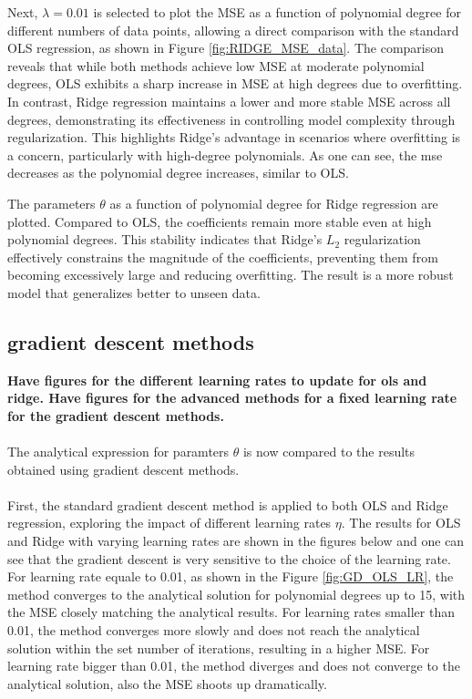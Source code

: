 \documentclass[%
 reprint,            %
 amsmath,amssymb,
 aps,
]{revtex4-2}
\begin{document}


Next, $\lambda = 0.01$ is selected to plot the MSE as a function of polynomial degree for different numbers of data points, allowing a direct comparison with the standard OLS regression, as shown in Figure \ref{fig:RIDGE_MSE_data}. 
The comparison reveals that while both methods achieve low MSE at moderate polynomial degrees, OLS exhibits a sharp increase in MSE at high degrees due to overfitting. In contrast, Ridge regression maintains a lower and more stable MSE across all degrees, demonstrating its effectiveness in controlling model complexity through regularization. This highlights Ridge's advantage in scenarios where overfitting is a concern, particularly with high-degree polynomials.
As one can see, the mse decreases as the polynomial degree increases, similar to OLS.


The parameters $\theta$ as a function of polynomial degree for Ridge regression are plotted. Compared to OLS, the coefficients remain more stable even at high polynomial degrees. 
This stability indicates that Ridge's $L_2$ regularization effectively constrains the magnitude of the coefficients, preventing them from becoming excessively large and reducing overfitting.
The result is a more robust model that generalizes better to unseen data.

\subsection{gradient descent methods}
\textbf{Have figures for the different learning rates to update for ols and ridge. Have figures for the advanced methods for a fixed learning rate for the gradient descent methods.}\\\\
The analytical expression for paramters $\theta$ is now compared to the results obtained using gradient descent methods.\\\\
First, the standard gradient descent method is applied to both OLS and Ridge regression, exploring the impact of different learning rates $\eta$. 
The results for OLS and Ridge with varying learning rates are shown in the figures below and one can see that the gradient descent is very sensitive to the choice of the learning rate.
For learning rate equale to 0.01, as shown in the Figure \ref{fig:GD_OLS_LR}, the method converges to the analytical solution for polynomial degrees up to 15, with the MSE closely matching the analytical results.
For learning rates smaller than 0.01, the method converges more slowly and does not reach the analytical solution within the set number of iterations, resulting in a higher MSE. 
For learning rate bigger than 0.01, the method diverges and does not converge to the analytical solution, also the MSE shoots up dramatically.\\
\end{document}
